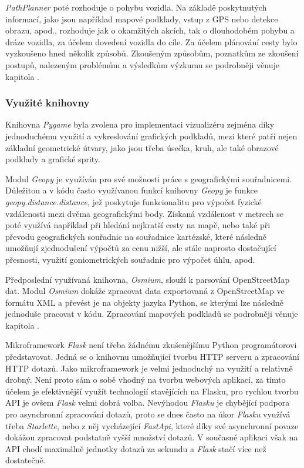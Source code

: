 \documentclass[czech,bachelor,dept460,male,cpp,cpdeclaration]{diploma}
\begin{document}
\emph{PathPlanner} poté rozhoduje o pohybu vozidla. Na základě poskytnutých informací, jako jsou například mapové podklady, vstup
z GPS nebo detekce obrazu, apod., rozhoduje jak o okamžitých akcích, tak o dlouhodobém pohybu a dráze vozidla, za účelem dovedení
vozidla do cíle. Za účelem plánování cesty bylo vyzkoušeno hned několik způsobů. Zkoušeným způsobům, poznatkům ze zkoušení 
postupů, nalezeným problémům a výsledkům výzkumu se podrobněji věnuje kapitola .

\subsubsection{Využité knihovny}

Knihovna \emph{Pygame} byla zvolena pro implementaci vizualizéru zejména díky jednoduchému využití a vykreslování grafických 
podkladů, mezi které patří nejen základní geometrické útvary, jako jsou třeba úsečka, kruh, ale také obrazové podklady a grafické 
sprity. 

Modul \emph{Geopy} je využíván pro své možnosti práce s geografickými souřadnicemi. Důležitou a v kódu často využívanou funkcí 
knihovny \emph{Geopy} je funkce \emph{geopy.distance.distance}, jež poskytuje funkcionalitu pro výpočet fyzické vzdálenosti mezi
dvěma geografickými body. Získaná vzdálenost v metrech se poté využívá například při hledání nejkratší cesty na mapě, nebo také
při převodu geografických souřadnic na souřadnice kartézské, které následně umožňují zjednodušení výpočtů za cenu nižší, ale stále
naprosto dostačující přesnosti, využití goniometrických souřadnic pro výpočet úhlu, apod.

Předposlední využívaná knihovna, \emph{Osmium}, slouží k parsování OpenStreetMap dat. Modul \emph{Osmium} dokáže zpracovat data 
exportovaná z OpenStreetMap ve formátu XML a převést je na objekty jazyka Python, se kterými lze následně jednoduše pracovat 
v kódu. Zpracování mapových podkladů se podrobněji věnuje kapitola .

Mikroframework \emph{Flask} není třeba žádnému zkušenějšímu Python programátorovi představovat. Jedná se o knihovnu umožňující 
tvorbu HTTP serveru a zpracování HTTP dotazů. Jako mikroframework je velmi jednoduchý na využití a relativně drobný. Není proto
sám o sobě vhodný na tvorbu webových aplikací, za tímto účelem je efektivnější využít technologií stavějících na Flasku, pro
rychlou tvorbu API je ovšem \emph{Flask} velmi dobrá volba. Nevýhodou \emph{Flasku} je chybějící podpora pro asynchronní 
zpracování dotazů, proto se dnes často na úkor \emph{Flasku} využívá třeba \emph{Starlette}, nebo z něj vycházející 
\emph{FastApi}, které díky své asynchronní povaze dokážou zpracovat podstatně vyšší množství dotazů. V současné aplikaci však 
na API chodí maximálně jednotky dotazů za sekundu a \emph{Flask} stačí více než dostatečně.
\end{document}
